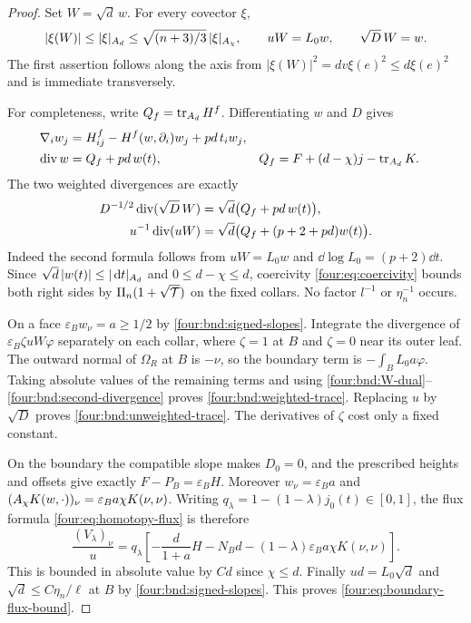 \begin{proof}
Set $W=\sqrt d\,w$.  For every covector $\xi$,
\begin{equation}\label{four:bnd:W-dual}
 |\xi(W)|\le|\xi|_{A_d}
 \le\sqrt{(n+3)/3}\,|\xi|_{A_\chi},\qquad
 uW=L_0w,\qquad \sqrt D\,W=w.
\end{equation}
The first assertion follows along the axis from
$|\xi(W)|^2=dv\xi(e)^2\le d\xi(e)^2$ and is immediate
transversely.

For completeness, write $Q_f=\operatorname{tr}_{A_d}H^f$.  Differentiating $w$
and $D$ gives
\begin{align*}
 \nabla_iw_j&=H^f_{ij}-H^f(w,\partial_i)w_j+p d\,t_iw_j,\\
 \operatorname{div} w&=Q_f+p d\,w(t),
 &Q_f&=F+(d-\chi)j-\operatorname{tr}_{A_d}K.
\end{align*}
The two weighted divergences are exactly
\begin{align}
 D^{-1/2}\operatorname{div}(\sqrt D\,W)
 &=\sqrt d\bigl(Q_f+p d\,w(t)\bigr),\label{four:bnd:first-divergence}\\
 u^{-1}\operatorname{div}(uW)
 &=\sqrt d\bigl(Q_f+(p+2+p d)w(t)\bigr).
 \label{four:bnd:second-divergence}
\end{align}
Indeed the second formula follows from $uW=L_0w$ and
$\dd\log L_0=(p+2)\dd t$.  Since
$\sqrt d\,|w(t)|\le|\,\mathrm d t|_{A_d}$ and
$0\le d-\chi\le d$, coercivity \eqref{four:eq:coercivity} bounds
both right sides by $\Pi_n(1+\sqrt{\mathcal T})$ on the fixed collars.
No factor $l^{-1}$ or $\eta_n^{-1}$ occurs.

On a face $\varepsilon_Bw_\nu=a\ge1/2$ by
\eqref{four:bnd:signed-slopes}.  Integrate the divergence of
$\varepsilon_B\zeta uW\varphi$ separately on each collar, where
$\zeta=1$ at $B$ and $\zeta=0$ near its outer leaf.  The outward
normal of $\Omega_R$ at $B$ is $-\nu$, so the boundary term is
$-\int_B L_0a\varphi$.  Taking absolute values of the remaining
terms and using \eqref{four:bnd:W-dual}--\eqref{four:bnd:second-divergence}
proves \eqref{four:bnd:weighted-trace}.  Replacing $u$ by $\sqrt D$
proves \eqref{four:bnd:unweighted-trace}.  The derivatives of $\zeta$
cost only a fixed constant.

On the boundary the compatible slope makes $D_0=0$, and the
prescribed heights and offsets give exactly
$F-P_B=\varepsilon_BH$.  Moreover $w_\nu=\varepsilon_Ba$ and
$(A_\chi K(w,\cdot))_\nu=\varepsilon_Ba\chi K(\nu,\nu)$.
Writing $q_\lambda=1-(1-\lambda)j_0(t)\in[0,1]$, the flux
formula \eqref{four:eq:homotopy-flux} is therefore
\[
 \frac{(V_\lambda)_\nu}{u}
 =q_\lambda\left[
 -\frac{d}{1+a}H-N_Bd
 -(1-\lambda)\varepsilon_Ba\chi K(\nu,\nu)\right].
\]
This is bounded in absolute value by $Cd$ since $\chi\le d$.
Finally $ud=L_0\sqrt d$ and
$\sqrt d\le C\eta_n/\ell$ at $B$ by
\eqref{four:bnd:signed-slopes}.  This proves
\eqref{four:eq:boundary-flux-bound}.
\end{proof}

